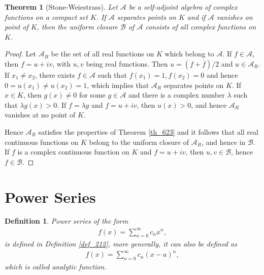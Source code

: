 \documentclass[10pt]{book}
\newtheorem{definition}{Definition}[chapter]
\newtheorem{theorem}{Theorem}[chapter]
\theoremstyle{definition}
\numberwithin{equation}{chapter}
\begin{document}
\begin{theorem}[Stone-Weiestrass]\label{th_624}
Let $\mathscr{A}$ be a self-adjoint algebra of complex functions on a compact set $K$. If $\mathscr{A}$ separates points on $K$ and if $\mathscr{A}$ vanishes on point of $K$, then the uniform closure $\mathscr{B}$ of $\mathscr{A}$ consists of all complex functions on $K$.
\end{theorem}
\begin{proof}
Let $\mathscr{A}_R$ be the set of all real functions on $K$ which belong to $\mathscr{A}$. If $f \in \mathscr{A}$, then $f = u + iv$, with $u,v$ being real functions. Then $u = (f + \overline{f})/2$ and $u \in \mathscr{A}_R$. If $x_1 \neq x_2$, there exists $f \in \mathscr{A}$ such that $f(x_1) = 1, f(x_2) = 0$ and hence $0 = u(x_1) \neq u(x_2) = 1$, which implies that $\mathscr{A}_R$ separates points on $K$. If $x \in K$, then $g(x) \neq 0$ for some $g \in \mathscr{A}$ and there is a complex number $\lambda$ such that $\lambda g(x) > 0$. If $f = \lambda g$ and $f = u + iv$, then $u(x) > 0$, and hence $\mathscr{A}_R$ vanishes at no point of $K$.

Hence $\mathscr{A}_R$ satisfies the properties of Theorem \ref{th_623} and it follows that all real continuous functions on $K$ belong to the uniform closure of $\mathscr{A}_R$, and hence in $\mathscr{B}$. If $f$ is a complex continuous function on $K$ and $f = u + iv$, then $u,v \in \mathscr{B}$, hence $f \in \mathscr{B}$.
\end{proof}



\medskip

\section{Power Series}

\begin{definition}
Power series of the form
\begin{align*}
    f(x) = \sum^\infty_{n=0} c_n x^n,
\end{align*}
is defined in Definition \ref{def_212}, more generally, it can also be defined as
\begin{align*}
    f(x) = \sum^\infty_{n=0} c_n (x - a)^n,
\end{align*}
which is called analytic function.
\end{definition}

\medskip
\end{document}
